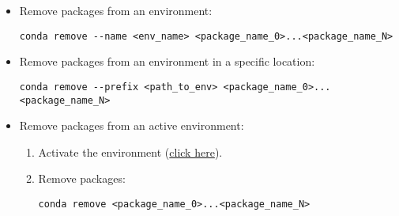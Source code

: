 \begin{itemize}
    \item Remove packages from an environment:
    \begin{verbatim}
conda remove --name <env_name> <package_name_0>...<package_name_N>
    \end{verbatim}
    \item Remove packages from an environment in a specific location:
    \begin{verbatim}
conda remove --prefix <path_to_env> <package_name_0>...<package_name_N>
    \end{verbatim}
    \item Remove packages from an active environment:
    \begin{enumerate}
        \item Activate the environment (\hyperref[conda:activateEnv]{click here}).
        \item Remove packages: 
        \begin{verbatim}
conda remove <package_name_0>...<package_name_N>
        \end{verbatim}
    \end{enumerate}
\end{itemize}